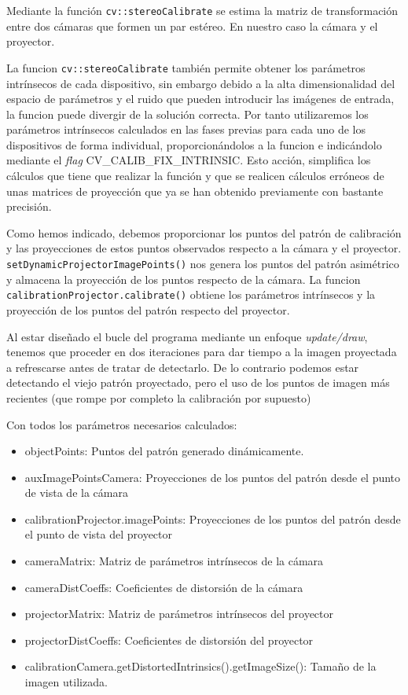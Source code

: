 Mediante la función \texttt{cv::stereoCalibrate} se estima la matriz de transformación entre dos cámaras que formen un par estéreo. En nuestro caso la cámara y el proyector. 

La funcion \texttt{cv::stereoCalibrate} también permite obtener los parámetros intrínsecos de cada dispositivo, sin embargo debido a la alta dimensionalidad del espacio de parámetros y el ruido que pueden introducir las imágenes de entrada, la funcion puede divergir de la solución correcta. Por tanto utilizaremos los parámetros intrínsecos calculados en las fases previas para cada uno de los dispositivos de forma individual, proporcionándolos a la funcion e indicándolo mediante el \emph{flag} CV\_CALIB\_FIX\_INTRINSIC. Esto acción, simplifica los cálculos que tiene que realizar la función y que se realicen cálculos erróneos de unas matrices de proyección que ya se han obtenido previamente con bastante precisión. 

Como hemos indicado, debemos proporcionar los puntos del patrón de calibración y las proyecciones de estos puntos observados respecto a la cámara y el proyector. \texttt{setDynamicProjectorImagePoints()} nos genera los puntos del patrón asimétrico y almacena la proyección de los puntos respecto de la cámara. La funcion \texttt{calibrationProjector.calibrate()} obtiene los parámetros intrínsecos y la proyección de los puntos del patrón respecto del proyector. 

Al estar diseñado el bucle del programa mediante un enfoque \emph{update/draw}, tenemos que proceder en dos iteraciones para dar tiempo a la imagen proyectada a refrescarse antes de tratar de detectarlo. De lo contrario podemos estar detectando el viejo patrón proyectado, pero el uso de los puntos de imagen más recientes (que rompe por completo la calibración por supuesto)

Con todos los parámetros necesarios calculados:
\begin{itemize}
  \item objectPoints: Puntos del patrón generado dinámicamente.
  \item auxImagePointsCamera: Proyecciones de los puntos del patrón desde el punto de vista de la cámara
  \item calibrationProjector.imagePoints: Proyecciones de los puntos del patrón desde el punto de vista del proyector
  \item cameraMatrix: Matriz de parámetros intrínsecos de la cámara
  \item cameraDistCoeffs: Coeficientes de distorsión de la cámara
  \item projectorMatrix: Matriz de parámetros intrínsecos del proyector
  \item projectorDistCoeffs: Coeficientes de distorsión del proyector
  \item calibrationCamera.getDistortedIntrinsics().getImageSize(): Tamaño de la imagen utilizada.
\end{itemize}  
 
